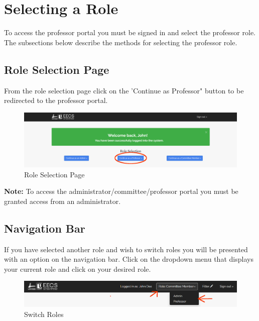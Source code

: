 \documentclass[fontsize=12pt,paper=letter,twoside]{scrartcl}
\begin{document}
\clearpage

\section{Selecting a Role}
To access the professor portal you must be signed in and select the professor role. The subsections below describe the methods for selecting the professor role.

\subsection{Role Selection Page}
From the role selection page click on the 'Continue as Professor" button to be redirected to the professor portal.

\begin{figure}[!htb]
\begin{center}
\includegraphics[width=.99\textwidth]{images/role-selection.png}
\end{center}
\caption{Role Selection Page}
\label{fig:role_selection1}
\end{figure}

\noindent \textbf{Note:} To access the administrator/committee/professor portal you must be granted access from an administrator.

\subsection{Navigation Bar}
If you have selected another role and wish to switch roles you will be presented with an option on the navigation bar. Click on the dropdown menu that displays your current role and click on your desired role.
\begin{figure}[!htb]
\begin{center}
\includegraphics[width=.99\textwidth]{images/role-selection2.png}
\end{center}
\caption{Switch Roles}
\label{fig:role_selection2}
\end{figure}
\end{document}
